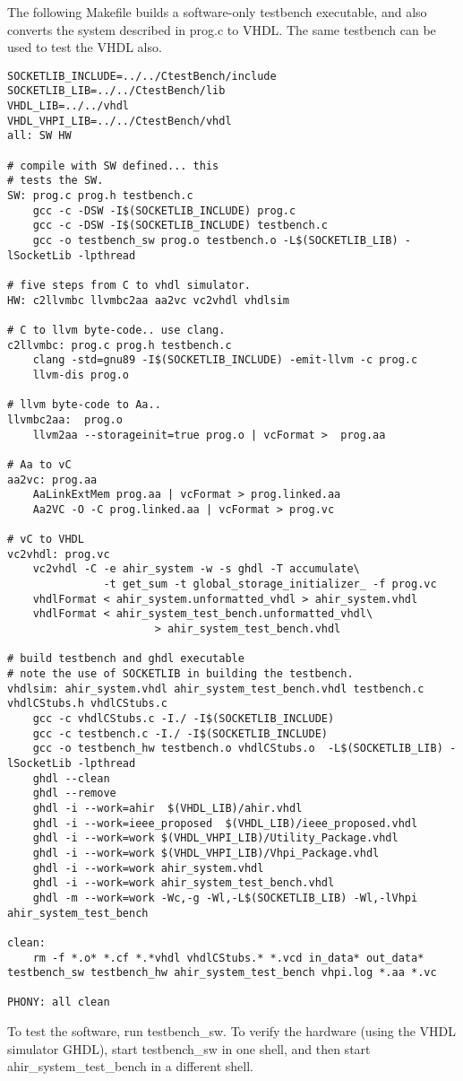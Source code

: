 \documentclass{article}
\begin{document}
The following Makefile builds a software-only testbench
executable, and also converts the system described in prog.c
to VHDL.  The same testbench can be used to test the VHDL
also.
\begin{verbatim}
SOCKETLIB_INCLUDE=../../CtestBench/include
SOCKETLIB_LIB=../../CtestBench/lib
VHDL_LIB=../../vhdl
VHDL_VHPI_LIB=../../CtestBench/vhdl
all: SW HW 

# compile with SW defined... this
# tests the SW.
SW: prog.c prog.h testbench.c 
	gcc -c -DSW -I$(SOCKETLIB_INCLUDE) prog.c
	gcc -c -DSW -I$(SOCKETLIB_INCLUDE) testbench.c
	gcc -o testbench_sw prog.o testbench.o -L$(SOCKETLIB_LIB) -lSocketLib -lpthread

# five steps from C to vhdl simulator.
HW: c2llvmbc llvmbc2aa aa2vc vc2vhdl vhdlsim

# C to llvm byte-code.. use clang.
c2llvmbc: prog.c prog.h testbench.c
	clang -std=gnu89 -I$(SOCKETLIB_INCLUDE) -emit-llvm -c prog.c
	llvm-dis prog.o

# llvm byte-code to Aa..
llvmbc2aa:  prog.o
	llvm2aa --storageinit=true prog.o | vcFormat >  prog.aa

# Aa to vC
aa2vc: prog.aa
	AaLinkExtMem prog.aa | vcFormat > prog.linked.aa
	Aa2VC -O -C prog.linked.aa | vcFormat > prog.vc

# vC to VHDL
vc2vhdl: prog.vc
	vc2vhdl -C -e ahir_system -w -s ghdl -T accumulate\
               -t get_sum -t global_storage_initializer_ -f prog.vc 
	vhdlFormat < ahir_system.unformatted_vhdl > ahir_system.vhdl
	vhdlFormat < ahir_system_test_bench.unformatted_vhdl\
                       > ahir_system_test_bench.vhdl

# build testbench and ghdl executable
# note the use of SOCKETLIB in building the testbench.
vhdlsim: ahir_system.vhdl ahir_system_test_bench.vhdl testbench.c vhdlCStubs.h vhdlCStubs.c
	gcc -c vhdlCStubs.c -I./ -I$(SOCKETLIB_INCLUDE)
	gcc -c testbench.c -I./ -I$(SOCKETLIB_INCLUDE)
	gcc -o testbench_hw testbench.o vhdlCStubs.o  -L$(SOCKETLIB_LIB) -lSocketLib -lpthread
	ghdl --clean
	ghdl --remove
	ghdl -i --work=ahir  $(VHDL_LIB)/ahir.vhdl
	ghdl -i --work=ieee_proposed  $(VHDL_LIB)/ieee_proposed.vhdl
	ghdl -i --work=work $(VHDL_VHPI_LIB)/Utility_Package.vhdl
	ghdl -i --work=work $(VHDL_VHPI_LIB)/Vhpi_Package.vhdl
	ghdl -i --work=work ahir_system.vhdl
	ghdl -i --work=work ahir_system_test_bench.vhdl
	ghdl -m --work=work -Wc,-g -Wl,-L$(SOCKETLIB_LIB) -Wl,-lVhpi ahir_system_test_bench 

clean:
	rm -f *.o* *.cf *.*vhdl vhdlCStubs.* *.vcd in_data* out_data* testbench_sw testbench_hw ahir_system_test_bench vhpi.log *.aa *.vc

PHONY: all clean	
\end{verbatim}
To test the software, run testbench\_sw.  To verify the hardware (using
the VHDL simulator GHDL), start testbench\_sw in one shell, and then start ahir\_system\_test\_bench
in a different shell.
\end{document}
